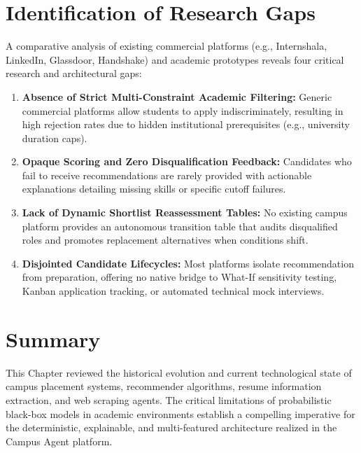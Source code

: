 \section{Identification of Research Gaps} \label{S2.6}
A comparative analysis of existing commercial platforms (e.g., Internshala, LinkedIn, Glassdoor, Handshake) and academic prototypes reveals four critical research and architectural gaps:
\begin{enumerate}[label=\textbf{\arabic*.}]
	\item \textbf{Absence of Strict Multi-Constraint Academic Filtering:} Generic commercial platforms allow students to apply indiscriminately, resulting in high rejection rates due to hidden institutional prerequisites (e.g., university duration caps).
	\item \textbf{Opaque Scoring and Zero Disqualification Feedback:} Candidates who fail to receive recommendations are rarely provided with actionable explanations detailing missing skills or specific cutoff failures.
	\item \textbf{Lack of Dynamic Shortlist Reassessment Tables:} No existing campus platform provides an autonomous transition table that audits disqualified roles and promotes replacement alternatives when conditions shift.
	\item \textbf{Disjointed Candidate Lifecycles:} Most platforms isolate recommendation from preparation, offering no native bridge to What-If sensitivity testing, Kanban application tracking, or automated technical mock interviews.
\end{enumerate}

\section{Summary} \label{S2.7}
This Chapter reviewed the historical evolution and current technological state of campus placement systems, recommender algorithms, resume information extraction, and web scraping agents. The critical limitations of probabilistic black-box models in academic environments establish a compelling imperative for the deterministic, explainable, and multi-featured architecture realized in the Campus Agent platform.
